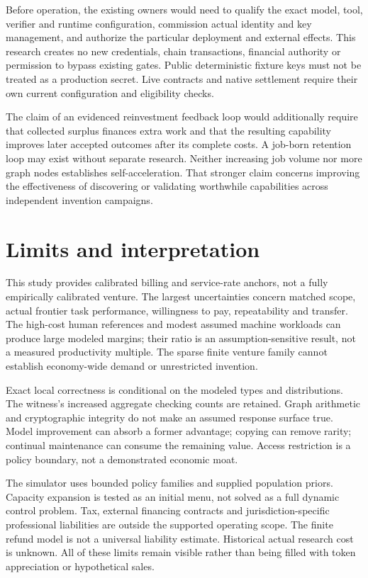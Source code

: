 \documentclass[11pt,letterpaper]{article}
\begin{document}
Before operation, the existing owners would need to qualify the exact model,
tool, verifier and runtime configuration, commission actual identity and key
management, and authorize the particular deployment and external effects.
This research creates no new credentials, chain transactions, financial authority
or permission to bypass existing gates. Public deterministic fixture keys must
not be treated as a production secret. Live contracts and native settlement
require their own current configuration and eligibility checks.

The claim of an evidenced reinvestment feedback loop would additionally require
that collected surplus finances extra work and that the resulting capability
improves later accepted outcomes after its complete costs. A job-born retention
loop may exist without separate research. Neither increasing job volume nor more
graph nodes establishes self-acceleration. That stronger claim concerns improving
the effectiveness of discovering or validating worthwhile capabilities across
independent invention campaigns.

\section{Limits and interpretation}

This study provides calibrated billing and service-rate anchors, not a fully
empirically calibrated venture. The largest uncertainties concern matched scope,
actual frontier task performance, willingness to pay, repeatability and transfer.
The high-cost human references and modest assumed machine workloads can produce
large modeled margins; their ratio is an assumption-sensitive result, not a
measured productivity multiple. The sparse finite venture family cannot establish
economy-wide demand or unrestricted invention.

Exact local correctness is conditional on the modeled types and distributions.
The witness's increased aggregate checking counts are retained. Graph arithmetic and
cryptographic integrity do not make an assumed response surface true. Model
improvement can absorb a former advantage; copying can remove rarity; continual
maintenance can consume the remaining value. Access restriction is a policy
boundary, not a demonstrated economic moat.

The simulator uses bounded policy families and supplied population priors.
Capacity expansion is tested as an initial menu, not solved as a full dynamic
control problem. Tax, external financing contracts and jurisdiction-specific
professional liabilities are outside the supported operating scope. The finite
refund model is not a universal liability estimate. Historical actual research
cost is unknown. All of these limits remain visible rather than being filled
with token appreciation or hypothetical sales.
\end{document}
